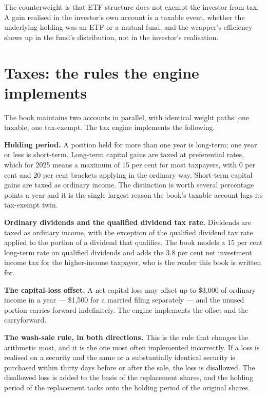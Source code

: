 The counterweight is that ETF structure does not exempt the investor from
tax. A gain realised in the investor's own account is a taxable event,
whether the underlying holding was an ETF or a mutual fund, and the
wrapper's efficiency shows up in the fund's distribution, not in the
investor's realisation.

\section{Taxes: the rules the engine implements}

The book maintains two accounts in parallel, with identical weight paths:
one taxable, one tax-exempt. The tax engine implements the following.

\textbf{Holding period.} A position held for more than one year is
long-term; one year or less is short-term. Long-term capital gains are
taxed at preferential rates, which for 2025 means a maximum of 15 per cent
for most taxpayers, with 0 per cent and 20 per cent brackets applying in
the ordinary way. Short-term capital gains are taxed as ordinary income.
The distinction is worth several percentage points a year and it is the
single largest reason the book's taxable account lags its tax-exempt
twin.

\textbf{Ordinary dividends and the qualified dividend tax rate.} Dividends
are taxed as ordinary income, with the exception of the qualified dividend
tax rate applied to the portion of a dividend that qualifies. The book
models a 15 per cent long-term rate on qualified dividends and adds the
3.8 per cent net investment income tax for the higher-income taxpayer, who
is the reader this book is written for.

\textbf{The capital-loss offset.} A net capital loss may offset up to
\$3,000 of ordinary income in a year --- \$1,500 for a married filing
separately --- and the unused portion carries forward indefinitely. The
engine implements the offset and the carryforward.

\textbf{The wash-sale rule, in both directions.} This is the rule that
changes the arithmetic most, and it is the one most often implemented
incorrectly. If a loss is realised on a security and the same or a
substantially identical security is purchased within thirty days before or
after the sale, the loss is disallowed. The disallowed loss is added to the
basis of the replacement shares, and the holding period of the replacement
tacks onto the holding period of the original shares.


